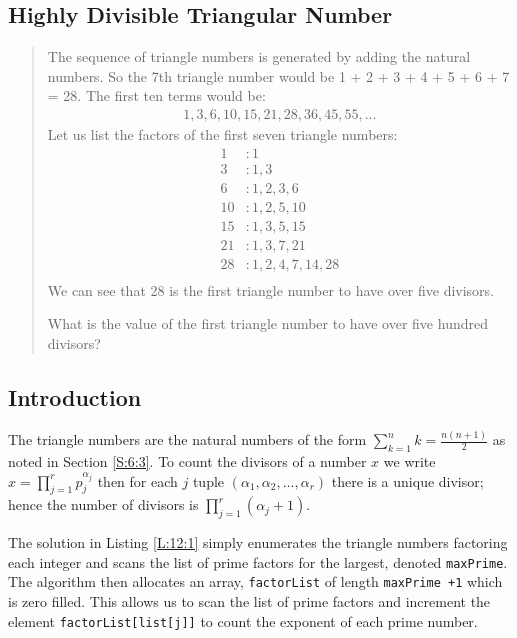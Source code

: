 \documentclass[oneside,12pt]{book}   	%
\newcounter{ex}
\newcounter{pr}
\theoremstyle{definition}
\begin{document}
\begin{spacing}{1.618}
			
	
	\chapter{Highly Divisible Triangular Number}\label{C:12}
	
		\begin{quote}
			The sequence of triangle numbers is generated by adding the natural numbers. So the 7th triangle number would be 1 + 2 + 3 + 4 + 5 + 6 + 7 = 28. The first ten terms would be:
			\begin{alignat*}{4}
				1, 3, 6, 10, 15, 21, 28, 36, 45, 55, \dots
			\end{alignat*}
			Let us list the factors of the first seven triangle numbers:
			\begin{alignat*}{4}
				 1&: 1\\
				 3&: 1,3\\
				 6&: 1,2,3,6\\
				10&: 1,2,5,10\\
				15&: 1,3,5,15\\
				21&: 1,3,7,21\\
				28&: 1,2,4,7,14,28\\
			\end{alignat*}
			We can see that 28 is the first triangle number to have over five divisors.

			What is the value of the first triangle number to have over five hundred divisors?
		\end{quote}
		
		\section{Introduction}
		
			The triangle numbers are the natural numbers of the form $\sum_{k=1}^n k=\frac{n(n+1)}{2}$ as noted in Section \ref{S:6:3}. To count the divisors of a number $x$ we write $x=\prod_{j=1}^r{p_j^{\alpha_j}}$ then for each $j$ tuple $(\alpha_1, \alpha_2, \dots, \alpha_r)$ there is a unique divisor; hence the number of divisors is $\prod_{j=1}^r(\alpha_j+1)$. 
			
			The solution in Listing \ref{L:12:1} simply enumerates the triangle numbers factoring each integer and scans the list of prime factors for the largest, denoted \texttt{maxPrime}. The algorithm then allocates an array, \texttt{factorList} of length \texttt{maxPrime +1} which is zero filled. This allows us to scan the list of prime factors and increment the element \texttt{factorList[list[j]]} to count the exponent of each prime number. 
			

\end{spacing}
\end{document}
